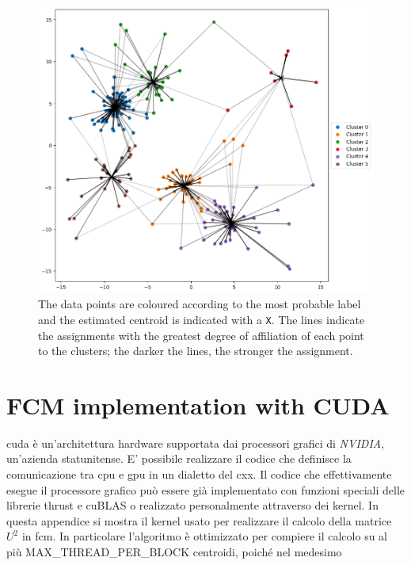 \begin{figure}[h]
    \centering
    \includegraphics[width=0.9\linewidth]{Figures/dati_fcm.png}
    \caption[example of \gls{fcm} clustering]{The data points are coloured according to the most probable label and the estimated centroid is indicated with a \texttt{X}. The lines indicate the assignments with the greatest degree of affiliation of each point to the clusters; the darker the lines, the stronger the assignment.}
    \label{fig:data_fcm}
\end{figure}

\chapter{FCM implementation with CUDA}
\gls{cuda} è un'architettura hardware supportata dai processori grafici di \emph{NVIDIA}, un'azienda statunitense. E' possibile realizzare il codice che definisce la comunicazione tra \gls{cpu} e \gls{gpu} in un dialetto del \gls{cxx}. Il codice che effettivamente esegue il processore grafico può essere già implementato con funzioni speciali delle librerie \gls{thrust} e \gls{cuBLAS} o realizzato personalmente attraverso dei kernel. In questa appendice si mostra il kernel usato per realizzare il calcolo della matrice $U^2$ in \gls{fcm}. In particolare l'algoritmo è ottimizzato per compiere il calcolo su al più MAX\_THREAD\_PER\_BLOCK centroidi, poiché nel medesimo

